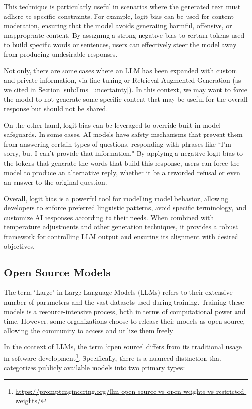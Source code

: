This technique is particularly useful in scenarios where the generated text must
adhere to specific constraints. For example, logit bias can be used for content
moderation, ensuring that the model avoids generating harmful, offensive, or inappropriate
content. By assigning a strong negative bias to certain tokens used to build
specific words or sentences, users can effectively steer the model away from producing
undesirable responses.

Not only, there are some cases where an LLM has been expanded with custom and
private information, via fine-tuning or Retrieval Augmented Generation (as we
cited in Section \ref{sub:llms_uncertainty}). In this context, we may want to force
the model to not generate some specific content that may be useful for the overall
response but should not be shared.

On the other hand, logit bias can be leveraged to override built-in model
safeguards. In some cases, AI models have safety mechanisms that prevent them
from answering certain types of questions, responding with phrases like ``I'm sorry,
but I can't provide that information." By applying a negative logit bias to the
tokens that generate the words that build this response, users can force the model
to produce an alternative reply, whether it be a reworded refusal or even an
answer to the original question.

Overall, logit bias is a powerful tool for modelling model behavior, allowing
developers to enforce preferred linguistic patterns, avoid specific terminology,
and customize AI responses according to their needs. When combined with temperature
adjustments and other generation techniques, it provides a robust framework for
controlling LLM output and ensuring its alignment with desired objectives.

\subsection{Open Source Models}

The term `Large' in Large Language Models (LLMs) refers to their extensive number
of parameters and the vast datasets used during training. Training these models
is a resource-intensive process, both in terms of computational power and time.
However, some organizations choose to release their models as open source,
allowing the community to access and utilize them freely.

In the context of LLMs, the term `open source' differs from its traditional usage
in software development\footnote{\url{https://promptengineering.org/llm-open-source-vs-open-weights-vs-restricted-weights/}}.
Specifically, there is a nuanced distinction that categorizes publicly available
models into two primary types:

